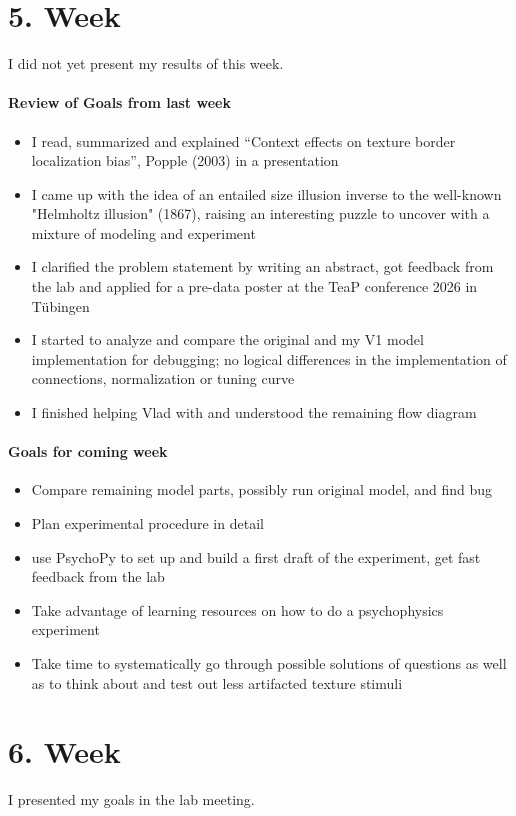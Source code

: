 \section*{5. Week}
I did not yet present my results of this week.
\paragraph{Review of Goals from last week}
\begin{itemize}
	\item I read, summarized and explained “Context effects on texture border localization bias”, Popple (2003) in a presentation
	\item I came up with the idea of an entailed size illusion inverse to the well-known "Helmholtz illusion" (1867), raising an interesting puzzle to uncover with a mixture of modeling and experiment
	\item I clarified the problem statement by writing an abstract, got feedback from the lab and applied for a pre-data poster at the TeaP conference 2026 in Tübingen 
	\item I started to analyze and compare the original and my V1 model implementation for debugging; no logical differences in the implementation of connections, normalization or tuning curve
	\item I finished helping Vlad with and understood the remaining flow diagram
\end{itemize}

\paragraph{Goals for coming week}
\begin{itemize}
	\item Compare remaining model parts, possibly run original model, and find bug
	\item Plan experimental procedure in detail
	\item use PsychoPy to set up and build a first draft of the experiment, get fast feedback from the lab
	\item Take advantage of learning resources on how to do a psychophysics experiment
	\item Take time to systematically go through possible solutions of questions as well as to think about and test out less artifacted texture stimuli
\end{itemize}


\section*{6. Week}
I presented my goals in the lab meeting.
